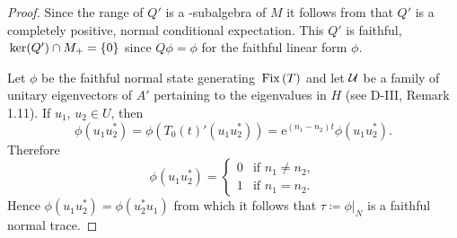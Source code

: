 \begin{proof}
Since the range of $Q'$ is a \WA-subalgebra of $M$ it follows from \citet[Theorem III.3.4]{takesaki:1979} that $Q'$ is a completely positive, normal conditional expectation.
This $Q'$ is faithful, \ie $\mathop{}\mathrm{ker}(Q') \cap M_{+} = \{0\}$ since $Q\phi = \phi$ for the faithful linear form $\phi$.

Let $\phi$ be the faithful normal state generating $\mathop{}\mathrm{Fix}\left(T\right)$ and let $\mathcal{U}$ be a family of unitary eigenvectors of $A'$ pertaining to the eigenvalues in $H$ (see D-III, Remark 1.11).
If $u_{1}$, $u_{2} \in U$, then
\[
\phi(u_{1}u_{2}^{*}) = \phi(T_{0}(t)'(u_{1}u_{2}^{*})) = \mathrm{e}^{(n_{1}-n_{2})t}\phi(u_{1}u_{2}^{*}).
\]
Therefore
\[
\phi(u_{1}u_{2}^{*}) = 
    \begin{cases} 
        0 & \text{if } n_{1} \neq n_{2}, \\ 
        1 & \text{if } n_{1} = n_{2}. 
    \end{cases}
\]
Hence $\phi(u_{1}u_{2}^{*}) = \phi(u_{2}^{*}u_{1})$ from which it follows that $\tau \coloneqq \phi|_{N}$ is a faithful normal trace.
\end{proof}
